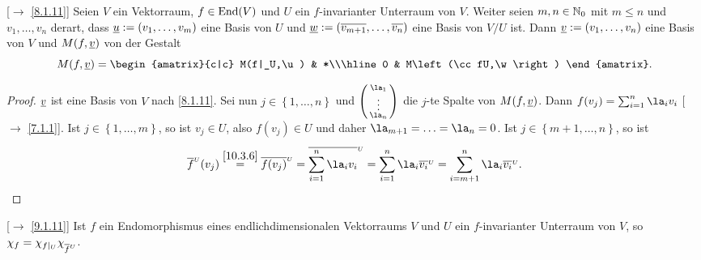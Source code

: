 \documentclass[../../main.tex]{subfiles}
\begin{document}
\begin{lem}\label{10.3.7}
{\rm[$\to$ \ref{8.1.11}]} Seien $V$ ein Vektorraum, $f\in \operatorname{End}(V)$ und $U$ ein $f$-invarianter Unterraum von $V$. Weiter seien $m,n\in \mathbb N_0$ mit $m\le n$ und $v_1,\ldots,v_n$ derart, dass ${\underline u} := (v_1,\ldots,v_m)$ eine Basis von $U$ und ${\underline w} := (\overline{v_{m+1}},\ldots,\overline{v_n})$ eine Basis von $V/U$ ist. Dann ${\underline v} := (v_1,\ldots,v_n)$ eine Basis von $V$ und $M(f,{\underline v})$ von der Gestalt
\[M(f,\v) = \begin{amatrix}{c|c}
M(f|_U,\u) & *\\\hline
0 & M\left(\cc fU,\w\right)
\end{amatrix}.\]
\end{lem}
\begin{proof}
${\underline v}$ ist eine Basis von $V$ nach \ref{8.1.11}. Sei nun $j\in \left\{1,\ldots,n\right\}$ und $\cvec{\la_1\\\vdots\\\la_n}$ die $j$-te Spalte von $M(f,{\underline v})$. Dann $f(v_j) = \sum_{i = 1}^{n}\la_iv_i$ [$\to$ \ref{7.1.1}]. Ist $j\in \left\{1,\ldots,m\right\}$, so ist $v_j\in U$, also $f(v_j)\in U$ und daher $\la_{m+1} = \ldots = \la_n = 0$. Ist $j\in \left\{m+1,\ldots,n\right\}$, so ist
$$\cc fU(v_j) \overset{\ref{10.3.6}}{=}\cc{f(v_j)}U= \cc{\sum_{i = 1}^{n}\la_iv_i}U = \sum_{i = 1}^{n}\la_i\cc{v_i}U=
\sum_{i = m+1}^{n}\la_i \cc{v_i}U.$$
\end{proof}

\begin{kor}\label{10.3.8}
{\rm[$\to$ \ref{9.1.11}]} Ist $f$ ein Endomorphismus eines endlichdimensionalen Vektorraums $V$ und $U$ ein $f$-invarianter Unterraum von $V$, so $\chi_f = \chi_{f|_U}\chi_{\overline{f}^{\substack{\\\scriptscriptstyle U}}}$.
\end{kor}
\end{document}
